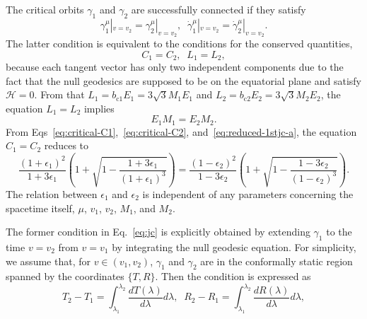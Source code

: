 \documentclass[prd,showpacs,preprintnumbers,groupedaddress,superscriptaddress,nofootinbib,11pt]{revtex4-1} %
\theoremstyle{newplain}
\newcommand{\mr}[1]{\mathrm{#1}}
\begin{document}
\par
The critical orbits $\gamma_1$ and $\gamma_2$ are successfully connected if they satisfy
\begin{equation}
\label{eq:jc}
\gamma_1^\mu|_{v=v_2}=\gamma_2^\mu|_{v=v_2},\;\;\dot\gamma_1^\mu|_{v=v_2}=\dot\gamma_2^\mu|_{v=v_2}.
\end{equation}
The latter condition is equivalent to the conditions for the conserved quantities,
\begin{equation}
\label{eq:1stjc}
C_1=C_2,\;\;L_1=L_2,
\end{equation}
because each tangent vector has only two independent components due to the fact that the null geodesics are supposed to be on the equatorial plane and satisfy $\mathcal{H}=0$.
From that $L_1=b_{\mathrm{c}1}E_1=3\sqrt{3}M_1E_1$ and $L_2=b_{\mathrm{c}2}E_2=3\sqrt{3}M_2E_2$,
the equation $L_1=L_2$ implies
\begin{equation}
\label{eq:reduced-1stjc-a}
E_1M_1=E_2M_2.
\end{equation}
From Eqs~\eqref{eq:critical-C1},~\eqref{eq:critical-C2}, and~\eqref{eq:reduced-1stjc-a}, the equation $C_1=C_2$ reduces to
\begin{equation}
\label{eq:reduced-1stjc-b}
\frac{(1+\epsilon_1)^2}{1+3\epsilon_1}\left(1+\sqrt{1-\frac{1+3\epsilon_1}{(1+\epsilon_1)^3}}\right)
=\frac{(1-\epsilon_2)^2}{1-3\epsilon_2}\left(1+\sqrt{1-\frac{1-3\epsilon_2}{(1-\epsilon_2)^3}}\right).
\end{equation}
The relation between $\epsilon_1$ and $\epsilon_2$ is independent of any parameters concerning the spacetime itself, $\mu$, $v_1$, $v_2$, $M_1$, and $M_2$.
\par
The former condition in Eq.~\eqref{eq:jc} is explicitly obtained by extending $\gamma_1$ to the time $v=v_2$ from $v=v_1$ by integrating the null geodesic equation.
For simplicity, we assume that, for $v\in (v_1,v_2)$, $\gamma_1$ and $\gamma_2$ are in the conformally static region spanned by the coordinates $\{T,R\}$.
Then the condition is expressed as
\begin{equation}
\label{eq:2ndjc}
T_2-T_1=\int^{\lambda_2}_{\lambda_1}\frac{dT(\lambda)}{d\lambda}d\lambda,
\;\;R_2-R_1=\int^{\lambda_2}_{\lambda_1}\frac{dR(\lambda)}{d\lambda}d\lambda,
\end{equation}
\end{document}
